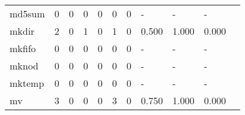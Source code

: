 \begin{longtable}{lp{1.20cm}p{1.20cm}p{1.20cm}p{1.20cm}p{1.20cm}p{1.20cm}p{1.20cm}p{1.20cm}p{1.20cm}p{1.20cm}}
md5sum    &                                     0 &                                                  0 &                                                  0 &                                                  0 &                                                  0 &                                                  0 &                                             - &                                                  - &                                                  - \\
mkdir     &                                     2 &                                                  0 &                                                  1 &                                                  0 &                                                  1 &                                                  0 &                                         0.500 &                                              1.000 &                                              0.000 \\
mkfifo    &                                     0 &                                                  0 &                                                  0 &                                                  0 &                                                  0 &                                                  0 &                                             - &                                                  - &                                                  - \\
mknod     &                                     0 &                                                  0 &                                                  0 &                                                  0 &                                                  0 &                                                  0 &                                             - &                                                  - &                                                  - \\
mktemp    &                                     0 &                                                  0 &                                                  0 &                                                  0 &                                                  0 &                                                  0 &                                             - &                                                  - &                                                  - \\
mv        &                                     3 &                                                  0 &                                                  0 &                                                  0 &                                                  3 &                                                  0 &                                         0.750 &                                              1.000 &                                              0.000 \\

\end{longtable}
